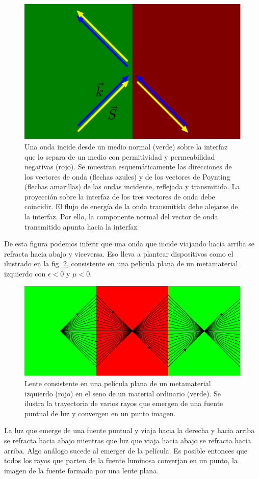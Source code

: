 \documentclass[12pt]{article}
\begin{document}
\begin{figure}
  \centering
  \includegraphics{talk-17}
  \caption{Una onda incide desde un medio normal (verde) sobre la
    interfaz que lo separa de un medio con permitividad y
    permeabilidad negativas (rojo). Se muestran esquemáticamente las
    direcciones de los vectores de onda (flechas azules) y de los
    vectores de Poynting (flechas amarillas) de las ondas incidente,
    reflejada y transmitida. La proyección sobre la interfaz de los
    tres vectores de onda debe coincidir. El flujo de energía de la
    onda transmitida debe alejarse de la interfaz. Por ello, la
    componente normal del vector de onda transmitido apunta hacia la
    interfaz.}
  \label{fig:refneg}
\end{figure}
De esta figura podemos inferir que una onda que incide viajando hacia
arriba se refracta hacia abajo y viceversa. Eso lleva a plantear
dispositivos como el ilustrado en la fig. \ref{fig:lenteplana},
consistente en una película plana de un metamaterial izquierdo con
$\epsilon<0$ y $\mu<0$.
\begin{figure}
  \centering
  \includegraphics{talk-24}
  \caption{Lente consistente en una película plana de un metamaterial
    izquierdo (rojo) en el seno de un material ordinario (verde). Se
    ilustra la trayectoria de varios rayos que emergen de una fuente
    puntual de luz y convergen en un punto imagen. }
  \label{fig:lenteplana}
\end{figure}
La luz que emerge de una fuente puntual y viaja hacia la derecha y
hacia arriba se refracta hacia abajo mientras que luz que viaja hacia
abajo se refracta hacia arriba. Algo análogo sucede al emerger de la
película. Es posible entonces que todos los rayos que parten de la
fuente luminosa converjan en un punto, la imagen de la fuente formada
por una lente plana.
\end{document}
